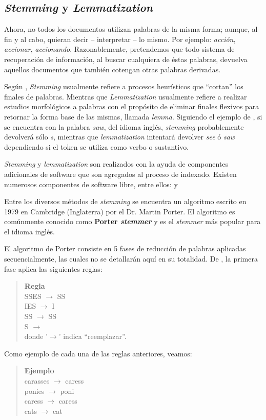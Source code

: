 	\subsection{\textit{Stemming} y \textit{Lemmatization}}
		Ahora, no todos los documentos utilizan palabras de la misma forma; aunque, al fin y al cabo, quieran decir -- interpretar -- lo mismo. Por ejemplo: \textit{acción}, \textit{accionar}, \textit{accionando}. Razonablemente, pretendemos que todo sistema de recuperación de información, al buscar cualquiera de éstas palabras, devuelva aquellos documentos que también cotengan otras palabras derivadas. \par
		
		Según \cite{manning2009}, \textit{Stemming} usualmente refiere a procesos heurísticos que \enquote{cortan} los finales de palabras. Mientras que \textit{Lemmatization} usualmente refiere a realizar estudios morfológicos a palabras con el propósito de eliminar finales flexivos para retornar la forma base de las mismas, llamada \textit{lemma}. Siguiendo el ejemplo de \cite{manning2009}, si se encuentra con la palabra \textit{saw}, del idioma inglés, \textit{stemming} probablemente devolverá sólo \textit{s}, mientras que \textit{lemmatization} intentará devolver \textit{see} ó \textit{saw} dependiendo si el token se utiliza como verbo o sustantivo. \par
		
		\textit{Stemming} y \textit{lemmatization} son realizados con la ayuda de componentes adicionales de software que son agregados al proceso de indexado. Existen numerosos componentes de software libre, entre ellos: \cite{multiLemmatisation} y \cite{Snowball} \par
		
		Entre los diversos métodos de \textit{stemming} se encuentra un algoritmo escrito en 1979 en Cambridge (Inglaterra) por el Dr. Martin Porter. El algoritmo es comúnmente conocido como \textbf{Porter \textit{stemmer}} y es el \textit{stemmer} más popular para el idioma inglés. \par
		El algoritmo de Porter consiste en 5 fases de reducción de palabras aplicadas secuencialmente, las cuales no se detallarán aquí en su totalidad. De \cite{porterSpammer}, la primera fase aplica las siguientes reglas:
		\begin{quote}
			\textbf{Regla} \\
			SSES $\rightarrow$ SS \\
			IES $\rightarrow$ I \\
			SS $\rightarrow$ SS \\
			S $\rightarrow$  \\
			donde '$\rightarrow$' indica \enquote{reemplazar}.
		\end{quote}
		Como ejemplo de cada una de las reglas anteriores, veamos:
		\begin{quote}
			\textbf{Ejemplo} \\
			carasses $\rightarrow$ caress \\
			ponies $\rightarrow$ poni \\
			caress $\rightarrow$ caress \\
			cats $\rightarrow$ cat \\
		\end{quote}
		
